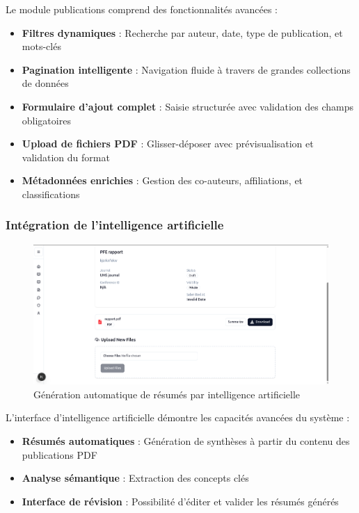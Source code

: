 \documentclass[12pt]{rapportPfe}
\begin{document}
Le module publications comprend des fonctionnalités avancées :
\begin{itemize}
    \item \textbf{Filtres dynamiques} : Recherche par auteur, date, type de publication, et mots-clés
    \item \textbf{Pagination intelligente} : Navigation fluide à travers de grandes collections de données
    \item \textbf{Formulaire d'ajout complet} : Saisie structurée avec validation des champs obligatoires
    \item \textbf{Upload de fichiers PDF} : Glisser-déposer avec prévisualisation et validation du format
    \item \textbf{Métadonnées enrichies} : Gestion des co-auteurs, affiliations, et classifications
\end{itemize}

\subsubsection{Intégration de l'intelligence artificielle}

\begin{figure}[H]
    \centering
    \includegraphics[width=1\textwidth]{diagrams/a_ss_13.png}
    \caption{Génération automatique de résumés par intelligence artificielle}
    \label{fig:ai_summary}
\end{figure}

L'interface d'intelligence artificielle démontre les capacités avancées du système :
\begin{itemize}
    \item \textbf{Résumés automatiques} : Génération de synthèses à partir du contenu des publications PDF
    \item \textbf{Analyse sémantique} : Extraction des concepts clés 
    \item \textbf{Interface de révision} : Possibilité d'éditer et valider les résumés générés
\end{itemize}
\end{document}
